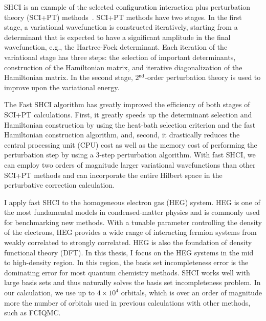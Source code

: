 \documentclass[phd,tocprelim]{cornell}
\begin{document}
SHCI is an example of the selected configuration interaction plus perturbation theory (SCI+PT)
methods~\cite{HurMalRan-JCP-73,BuePey-TCA-74,EvaDauMal-CP-83,CimPer-JCoP-87,Har-JCP-91,BytRue-CP-09,KelPerBarGre-JCP-14,CoeMurPat-CPL-14,Eva-JCP-14,SceAppGinCaf-JCoC-16,GarSceLooCaf-JCP-17,LooSceBloGarCafJac-JCP-18,TubLevHaiHeaWha-ARX-18}.
SCI+PT methods have two stages.
In the first stage, a variational wavefunction is constructed iteratively, starting from
a determinant that is expected to have a significant amplitude in the final wavefunction, e.g., the Hartree-Fock determinant.
Each iteration of the variational stage has three steps: the selection of important determinants, construction of the Hamiltonian matrix, and
iterative diagonalization of the Hamiltonian matrix.
In the second stage, 2$^{\rm nd}$-order perturbation theory is used to improve upon the variational energy.

The Fast SHCI algorithm has greatly improved the efficiency of both stages of SCI+PT calculations.
First, it greatly speeds up the determinant selection and Hamiltonian construction by using the heat-bath selection criterion and the fast Hamiltonian construction algorithm, and, second, it drastically reduces the central processing unit (CPU) cost as well as the memory cost of performing the perturbation step by using a 3-step perturbation algorithm.
With fast SHCI, we can employ two orders of magnitude larger variational wavefunctions than other SCI+PT methods and can incorporate the entire Hilbert space in the perturbative correction calculation.

I apply fast SHCI to the homogeneous electron gas (HEG) system.
HEG is one of the most fundamental models in condensed-matter physics and is commonly used for benchmarking new methods.
With a tunable parameter controlling the density of the electrons, HEG provides a wide range of interacting fermion systems from weakly correlated to strongly correlated.
HEG is also the foundation of density functional theory (DFT).
In this thesis, I focus on the HEG systems in the mid to high-density region.
In this region, the basis set incompleteness error is the dominating error for most quantum chemistry methods.
SHCI works well with large basis sets and thus naturally solves the basis set incompleteness problem.
In our calculation, we use up to $4\times10^4$ orbitals, which is over an order of magnitude more the number of orbitals used in previous calculations with other methods, such as FCIQMC.
\end{document}
